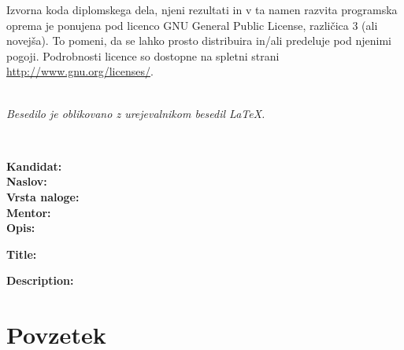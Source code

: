 \vspace*{1cm}
{\small \noindent
  Izvorna koda diplomskega dela, njeni rezultati in v ta namen razvita programska oprema je ponujena pod licenco GNU General Public License,
  različica 3 (ali novejša). To pomeni, da se lahko prosto distribuira in/ali predeluje pod njenimi pogoji.
  Podrobnosti licence so dostopne na spletni strani \url{http://www.gnu.org/licenses/}.
}

\vfill
\begin{center}
  \ \\ \vfill
  {\em
  Besedilo je oblikovano z urejevalnikom besedil \LaTeX.}
\end{center}

\clearemptydoublepage

\thispagestyle{empty}
\
\vfill

\bigskip
\noindent\textbf{Kandidat:} \tauthor\\
\noindent\textbf{Naslov:} \ttitle\\
\noindent\textbf{Vrsta naloge:} \tvrsta \\
\noindent\textbf{Mentor:} \tmentor \\

\bigskip
\noindent\textbf{Opis:}\\
\tdescription

\bigskip
\noindent\textbf{Title:} \ttitleEn

\bigskip
\noindent\textbf{Description:}\\
\tdescriptionEn

\vfill

\vspace{2cm}

\clearemptydoublepage

\thispagestyle{empty}\mbox{}\vfill\null\it%
\noindent
\tzahvala
\rm\normalfont

\clearemptydoublepage

\pagestyle{empty}
\def\thepage{}%
\tableofcontents{}

\clearemptydoublepage

\chapter*{Povzetek}

